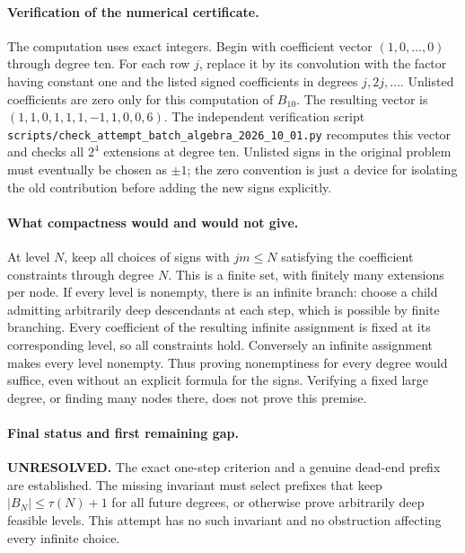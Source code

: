 \documentclass[11pt,a4paper]{article}
\begin{document}
\paragraph{Verification of the numerical certificate.}
The computation uses exact integers. Begin with coefficient vector
$(1,0,\ldots,0)$ through degree ten. For each row $j$, replace it
by its convolution with the factor having constant one and the
listed signed coefficients in degrees $j,2j,\ldots$. Unlisted
coefficients are zero only for this computation of $B_{10}$.
The resulting vector is
$(1,1,0,1,1,1,-1,1,0,0,6)$.
The independent verification script
\texttt{scripts/check\_attempt\_batch\_algebra\_2026\_10\_01.py}
recomputes this vector and checks all $2^4$ extensions at degree ten.
Unlisted signs in the original problem must eventually be chosen
as $\pm1$; the zero convention is just a device for isolating the
old contribution before adding the new signs explicitly.

\paragraph{What compactness would and would not give.}
At level $N$, keep all choices of signs with $jm\le N$ satisfying
the coefficient constraints through degree $N$. This is a finite
set, with finitely many extensions per node. If every level is
nonempty, there is an infinite branch: choose a child admitting
arbitrarily deep descendants at each step, which is possible by
finite branching. Every coefficient of the resulting infinite
assignment is fixed at its corresponding level, so all constraints
hold. Conversely an infinite assignment makes every level nonempty.
Thus proving nonemptiness for every degree would suffice, even
without an explicit formula for the signs. Verifying a fixed large
degree, or finding many nodes there, does not prove this premise.

\paragraph{Final status and first remaining gap.}
\textbf{UNRESOLVED.} The exact one-step criterion and a genuine
dead-end prefix are established. The missing invariant must select
prefixes that keep $|B_N|\le\tau(N)+1$ for all future degrees, or
otherwise prove arbitrarily deep feasible levels. This attempt has
no such invariant and no obstruction affecting every infinite choice.
\end{document}
